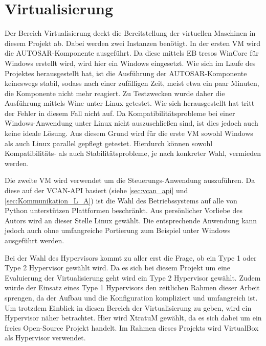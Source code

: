 \documentclass[
  a4paper,					    %
  twoside,
  DIV=calc,     				%
  bibliography=totoc,
  cleardoublepage=empty,
  ngerman,     					%
  final       					%
]{scrbook}
\begin{document}





\section{Virtualisierung}
\label{sec:Virtualisierung_Umgesetzt}
Der Bereich Virtualisierung deckt die Bereitstellung der virtuellen Maschinen in diesem Projekt ab. Dabei werden zwei Instanzen benötigt. In der ersten VM wird die AUTOSAR-Komponente ausgeführt. Da diese mittels EB tresos WinCore für Windows erstellt wird, wird hier ein Windows eingesetzt. Wie sich im Laufe des Projektes herausgestellt hat, ist die Ausführung der AUTOSAR-Komponente keineswegs stabil, sodass nach einer zufälligen Zeit, meist etwa ein paar Minuten, die Komponente nicht mehr reagiert. Zu Testzwecken wurde daher die Ausführung mittels Wine unter Linux getestet. Wie sich herausgestellt hat tritt der Fehler in diesem Fall nicht auf. Da Kompatibilitätsprobleme bei einer Windows-Anwendung unter Linux nicht auszuschließen sind, ist dies jedoch auch keine ideale Lösung. Aus diesem Grund wird für die erste VM sowohl Windows als auch Linux parallel gepflegt getestet. Hierdurch können sowohl Kompatibilitäts- als auch Stabilitätsprobleme, je nach konkreter Wahl, vermieden werden.

Die zweite VM wird verwendet um die Steuerungs-Anwendung auszuführen. Da diese auf der VCAN-API basiert (siehe \ref{sec:vcan_api} und \ref{sec:Kommunikation_L_A}) ist die Wahl des Betriebssystems auf alle von Python unterstützen Plattformen beschränkt. Aus persönlicher Vorliebe des Autors wird an dieser Stelle Linux gewählt. Die entsprechende Anwendung kann jedoch auch ohne umfangreiche Portierung zum Beispiel unter Windows ausgeführt werden.

Bei der Wahl des Hypervisors kommt zu aller erst die Frage, ob ein Type 1 oder Type 2 Hypervisor gewählt wird. Da es sich bei diesem Projekt um eine Evaluierung der Virtualisierung geht wird ein Type 2 Hypervisor gewählt. Zudem würde der Einsatz eines Type 1 Hypervisors den zeitlichen Rahmen dieser Arbeit sprengen, da der Aufbau und die Konfiguration kompliziert und umfangreich ist. Um trotzdem Einblick in diesen Bereich der Virtualisierung zu geben, wird ein Hypervisor näher betrachtet. Hier wird XtratuM gewählt, da es sich dabei um ein freies Open-Source Projekt handelt. Im Rahmen dieses Projekts wird VirtualBox als Hypervisor verwendet.
\end{document}
